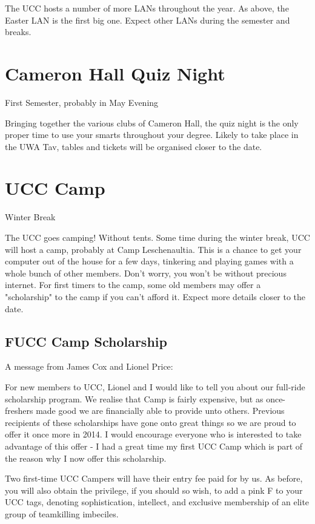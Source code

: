 The UCC hosts a number of more LANs throughout the year. As above, the Easter LAN is the first big one. Expect other LANs during the semester and breaks.

\section{Cameron Hall Quiz Night}
First Semester, probably in May
Evening

Bringing together the various clubs of Cameron Hall, the quiz night is the only proper time to use your smarts throughout your degree. Likely to take place in the UWA Tav, tables and tickets will be organised closer to the date.

\section{UCC Camp}
Winter Break

The UCC goes camping! Without tents. Some time during the winter break, UCC will host a camp, probably at Camp Leschenaultia. This is a chance to get your computer out of the house for a few days, tinkering and playing games with a whole bunch of other members. Don't worry, you won't be without precious internet. For first timers to the camp, some old members may offer a "scholarship" to the camp if you can't afford it. Expect more details closer to the date.

\subsection{FUCC Camp Scholarship}

A message from James Cox and Lionel Price:

For new members to UCC, Lionel and I would like to tell you about our
full-ride scholarship program. We realise that Camp is fairly
expensive, but as once-freshers made good we are financially able to
provide unto others. Previous recipients of these scholarships have
gone onto great things so we are proud to offer it once more in 2014.
I would encourage everyone who is interested to take advantage of this
offer - I had a great time my first UCC Camp which is part of the
reason why I now offer this scholarship.

Two first-time UCC Campers will have their entry fee paid for by us.
As before, you will also obtain the privilege, if you should so wish,
to add a pink F to your UCC tags, denoting sophistication, intellect,
and exclusive membership of an elite group of teamkilling imbeciles.

